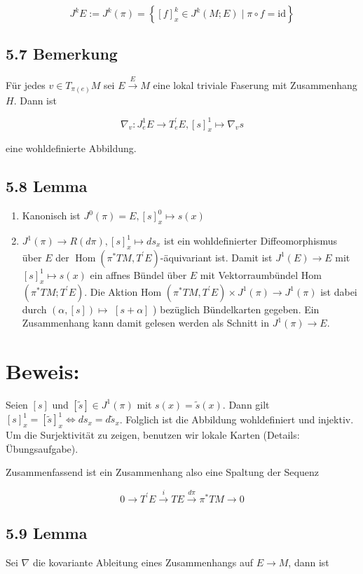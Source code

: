 $$
J^{k} E:=J^{k}(\pi)=\left\{[f]_{x}^{k} \in J^{k}(M ; E) \mid \pi \circ f=\mathrm{id}\right\}
$$

\subsection*{5.7 Bemerkung}
Für jedes $v \in T_{\pi(e)} M$ sei $E \xrightarrow{E} M$ eine lokal triviale Faserung mit Zusammenhang $H$. Dann ist

$$
\nabla_{v}: J_{e}^{1} E \rightarrow T_{e}^{\prime} E,[s]_{x}^{1} \mapsto \nabla_{v} s
$$

eine wohldefinierte Abbildung.

\subsection*{5.8 Lemma}
\begin{enumerate}
  \item Kanonisch ist $J^{0}(\pi)=E,[s]_{x}^{0} \mapsto s(x)$
  \item $J^{1}(\pi) \rightarrow R(d \pi),[s]_{x}^{1} \mapsto d s_{x}$ ist ein wohldefinierter Diffeomorphismus über $E$ der $\operatorname{Hom}\left(\pi^{*} T M, T^{\prime} E\right)$-äquivariant ist. Damit ist $J^{1}(E) \rightarrow E$ mit $[s]_{x}^{1} \mapsto s(x)$ ein affnes Bündel über $E$ mit Vektorraumbündel Hom $\left(\pi^{*} T M ; T^{\prime} E\right)$. Die Aktion Hom $\left(\pi^{*} T M, T^{\prime} E\right) \times J^{1}(\pi) \rightarrow J^{1}(\pi)$ ist dabei durch $(\alpha,[s]) \mapsto$ $[s+\alpha]$ ) bezüglich Bündelkarten gegeben. Ein Zusammenhang kann damit gelesen werden als Schnitt in $J^{1}(\pi) \rightarrow E$.
\end{enumerate}

\section*{Beweis:}
Seien $[s]$ und $[\tilde{s}] \in J^{1}(\pi)$ mit $s(x)=\tilde{s}(x)$. Dann gilt $[s]_{x}^{1}=[\tilde{s}]_{x}^{1} \Leftrightarrow d s_{x}=d \tilde{s}_{x}$. Folglich ist die Abbildung wohldefiniert und injektiv. Um die Surjektivität zu zeigen, benutzen wir lokale Karten (Details: Übungsaufgabe).

Zusammenfassend ist ein Zusammenhang also eine Spaltung der Sequenz

$$
0 \rightarrow T^{\prime} E \xrightarrow{i} T E \xrightarrow{d \pi} \pi^{*} T M \rightarrow 0
$$

\subsection*{5.9 Lemma}
Sei $\nabla$ die kovariante Ableitung eines Zusammenhangs auf $E \rightarrow M$, dann ist

